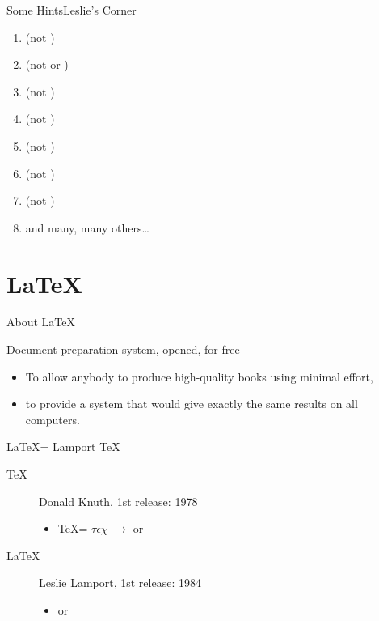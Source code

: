 \documentclass[xcolor=dvipsnames, aspectratio=169, handout, intlimits]{beamer}
\begin{document}
\begin{frame}{Some Hints}{Leslie's Corner}

\vspace{-0.5cm}
\begin{enumerate}
\item {} (not )
\item {} (not  or )
\item {} (not )
\item {} (not )
\item {} (not )
\item {} (not )
\item {} (not )
\item and many, many others\dots
\end{enumerate}

\end{frame}

\section{\LaTeX}
\begin{frame}{About \LaTeX}

\vspace{-0.5cm}
Document preparation system, opened, for free
\begin{itemize}
	\item To allow anybody to produce high-quality books using minimal effort,
	\item to provide a system that would give exactly the same results on all computers.
\end{itemize}
	
\vspace{0.5cm}
\LaTeX = Lamport \TeX
\begin{description}
	\item[\TeX] Donald Knuth, 1st release: 1978
	\begin{itemize}
		\item \TeX = $\tau \epsilon \chi$ $\rightarrow$  or 
	\end{itemize}
	\item[\LaTeX] Leslie Lamport, 1st release: 1984
	\begin{itemize}
		\item {} or 
	\end{itemize}
\end{description}


\end{frame}
\end{document}
